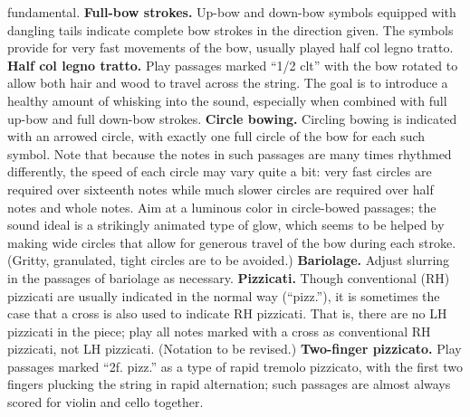 fundamental. \textbf{Full-bow strokes.} Up-bow and down-bow symbols equipped
with dangling tails indicate complete bow strokes in the direction given. The
symbols provide for very fast movements of the bow, usually played half col
legno tratto. \textbf{Half col legno tratto.} Play passages marked ``1/2 clt''
with the bow rotated to allow both hair and wood to travel across the string.
The goal is to introduce a healthy amount of whisking into the sound,
especially when combined with full up-bow and full down-bow strokes.
\textbf{Circle bowing.} Circling bowing is indicated with an arrowed circle,
with exactly one full circle of the bow for each such symbol. Note that because
the notes in such passages are many times rhythmed differently, the speed of
each circle may vary quite a bit: very fast circles are required over sixteenth
notes while much slower circles are required over half notes and whole notes.
Aim at a luminous color in circle-bowed passages; the sound ideal is a
strikingly animated type of glow, which seems to be helped by making wide
circles that allow for generous travel of the bow during each stroke. (Gritty,
granulated, tight circles are to be avoided.) \textbf{Bariolage.} Adjust
slurring in the passages of bariolage as necessary. \textbf{Pizzicati.} Though
conventional (RH) pizzicati are usually indicated in the normal way
(``pizz.''), it is sometimes the case that a cross is also used to indicate RH
pizzicati. That is, there are no LH pizzicati in the piece; play all notes
marked with a cross as conventional RH pizzicati, not LH pizzicati. (Notation
to be revised.) \textbf{Two-finger pizzicato.} Play passages marked ``2f.
pizz.'' as a type of rapid tremolo pizzicato, with the first two fingers
plucking the string in rapid alternation; such passages are almost always
scored for violin and cello together.
